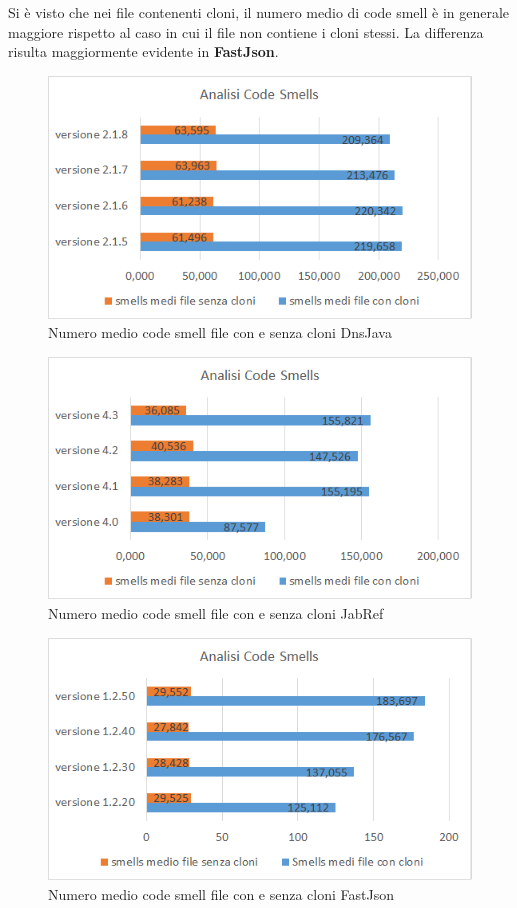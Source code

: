 Si è visto che nei file contenenti cloni, il numero medio di code smell è in generale maggiore rispetto al caso in cui il file non contiene i cloni stessi. La differenza risulta maggiormente evidente in \textbf{FastJson}.
\begin{figure}[h]
	\centering
	\includegraphics[scale=0.75, trim = 0cm 0cm 0cm 0cm, clip=true]{Grafici_dnsJava/CodeSmells.png}
	\caption{Numero medio code smell file con e senza cloni DnsJava}
	\label{fig:codeSmellDnsJava}	
\end{figure}
\begin{figure}[h]
	\centering
	\includegraphics[scale=0.75, trim = 0cm 0cm 0cm 0cm, clip=true]{Grafici_jabRef/CodeSmells.png}
	\caption{Numero medio code smell file con e senza cloni JabRef}
	\label{fig:codeSmellJabRef}
\end{figure}
\begin{figure}[h]
	\centering
	\includegraphics[scale=0.75, trim = 0cm 0cm 0cm 0cm, clip=true]{Grafici_fastJson/CodeSmell.png}
	\caption{Numero medio code smell file con e senza cloni FastJson}
	\label{fig:codeSmellFastjson}
\end{figure}
